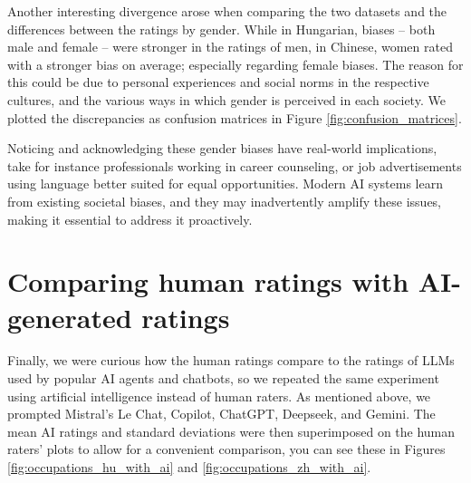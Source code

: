 \documentclass[11pt]{article}
\begin{document}
Another interesting divergence arose when comparing the two datasets and the differences between the ratings by gender. While in Hungarian, biases -- both male and female -- were stronger in the ratings of men, in Chinese, women rated with a stronger bias on average; especially regarding female biases. The reason for this could be due to personal experiences and social norms in the respective cultures, and the various ways in which gender is perceived in each society. We plotted the discrepancies as confusion matrices in Figure \ref{fig:confusion_matrices}.



Noticing and acknowledging these gender biases have real-world implications, take for instance professionals working in career counseling, or job advertisements using language better suited for equal opportunities. Modern AI systems learn from existing societal biases, and they may inadvertently amplify these issues, making it essential to address it proactively.


\section{Comparing human ratings with AI-generated ratings}
\label{sec:ai_comparison}

Finally, we were curious how the human ratings compare to the ratings of LLMs used by popular AI agents and chatbots, so we repeated the same experiment using artificial intelligence instead of human raters. As mentioned above, we prompted Mistral's Le Chat, Copilot, ChatGPT, Deepseek, and Gemini. The mean AI ratings and standard deviations were then superimposed on the human raters' plots to allow for a convenient comparison, you can see these in Figures \ref{fig:occupations_hu_with_ai} and \ref{fig:occupations_zh_with_ai}.
\end{document}

